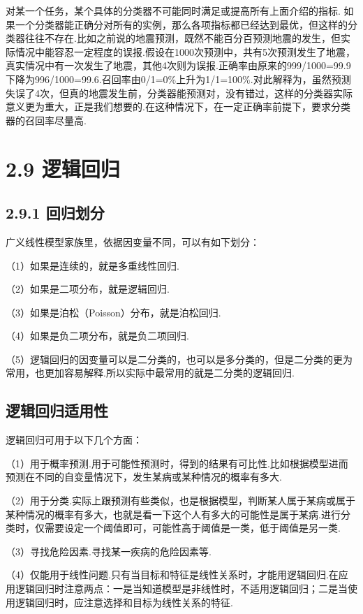 ​ 对某一个任务，某个具体的分类器不可能同时满足或提高所有上面介绍的指标.
​
如果一个分类器能正确分对所有的实例，那么各项指标都已经达到最优，但这样的分类器往往不存在.比如之前说的地震预测，既然不能百分百预测地震的发生，但实际情况中能容忍一定程度的误报.假设在1000次预测中，共有5次预测发生了地震，真实情况中有一次发生了地震，其他4次则为误报.正确率由原来的999/1000=99.9下降为996/1000=99.6.召回率由0/1=0\%上升为1/1=100\%.对此解释为，虽然预测失误了4次，但真的地震发生前，分类器能预测对，没有错过，这样的分类器实际意义更为重大，正是我们想要的.在这种情况下，在一定正确率前提下，要求分类器的召回率尽量高.

\section{2.9 逻辑回归}\label{ux903bux8f91ux56deux5f52}

\subsection{2.9.1 回归划分}\label{ux56deux5f52ux5212ux5206}

广义线性模型家族里，依据因变量不同，可以有如下划分：

（1）如果是连续的，就是多重线性回归.

（2）如果是二项分布，就是逻辑回归.

（3）如果是泊松（Poisson）分布，就是泊松回归.

（4）如果是负二项分布，就是负二项回归.

（5）逻辑回归的因变量可以是二分类的，也可以是多分类的，但是二分类的更为常用，也更加容易解释.所以实际中最常用的就是二分类的逻辑回归.

\subsection{逻辑回归适用性}\label{ux903bux8f91ux56deux5f52ux9002ux7528ux6027}

逻辑回归可用于以下几个方面：

（1）用于概率预测.用于可能性预测时，得到的结果有可比性.比如根据模型进而预测在不同的自变量情况下，发生某病或某种情况的概率有多大.

（2）用于分类.实际上跟预测有些类似，也是根据模型，判断某人属于某病或属于某种情况的概率有多大，也就是看一下这个人有多大的可能性是属于某病.进行分类时，仅需要设定一个阈值即可，可能性高于阈值是一类，低于阈值是另一类.

（3）寻找危险因素.寻找某一疾病的危险因素等.

（4）仅能用于线性问题.只有当目标和特征是线性关系时，才能用逻辑回归.在应用逻辑回归时注意两点：一是当知道模型是非线性时，不适用逻辑回归；二是当使用逻辑回归时，应注意选择和目标为线性关系的特征.

